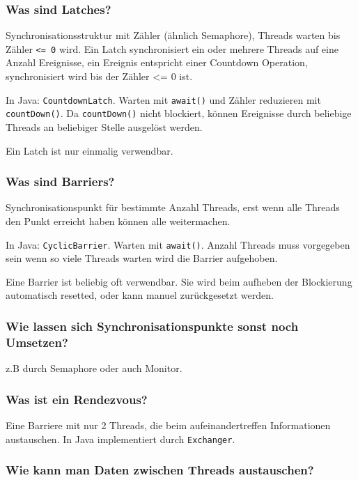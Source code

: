 \documentclass[10pt,a4paper]{scrartcl}
\begin{document}
\subsubsection{Was sind Latches? }

Synchronisationsstruktur mit Zähler (ähnlich Semaphore), Threads warten bis Zähler \texttt{<= 0} wird.
Ein Latch synchronisiert ein oder mehrere Threads auf eine Anzahl Ereignisse, ein Ereignis
entspricht einer Countdown Operation, synchronisiert wird bis der Zähler <= 0 ist.

In Java: \texttt{CountdownLatch}. Warten mit \texttt{await()} und Zähler reduzieren mit
\texttt{countDown()}. Da \texttt{countDown()} nicht blockiert, können Ereignisse durch beliebige
Threads an beliebiger Stelle ausgelöst werden.

Ein Latch ist nur einmalig verwendbar.
  
\subsubsection{Was sind Barriers?}

Synchronisationspunkt für bestimmte Anzahl Threads, erst wenn alle Threads den Punkt erreicht haben
können alle weitermachen.

In Java: \texttt{CyclicBarrier}. Warten mit \texttt{await()}. Anzahl Threads muss vorgegeben sein
wenn so viele Threads warten wird die Barrier aufgehoben.

Eine Barrier ist beliebig oft verwendbar. Sie wird beim aufheben der Blockierung automatisch
resetted, oder kann manuel zurückgesetzt werden.
  
\subsubsection{Wie lassen sich Synchronisationspunkte sonst noch Umsetzen?}

z.B durch Semaphore oder auch Monitor.
  
\subsubsection{Was ist ein Rendezvous?}

Eine Barriere mit nur 2 Threads, die beim aufeinandertreffen Informationen austauschen.
In Java implementiert durch \texttt{Exchanger}.
  
\subsubsection{Wie kann man Daten zwischen Threads austauschen?}
\end{document}
